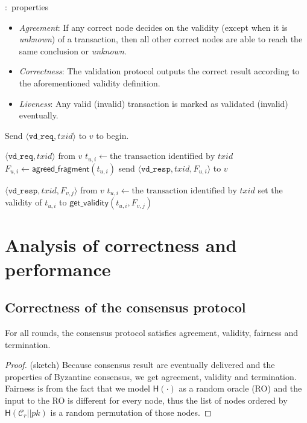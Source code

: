\documentclass{beamer}
\newcommand{\C}{\mathcal{C}}
\begin{document}
\begin{frame}{\subsecname:~properties}
\begin{itemize}
    \item \emph{Agreement}:
        If any correct node decides on the validity (except when it is \emph{unknown}) of a transaction,
        then all other correct nodes are able to reach the same conclusion or \emph{unknown}.
    \item \emph{Correctness}:
        The validation protocol outputs the correct result
        according to the aforementioned validity definition.
    \item \emph{Liveness}:
        Any valid (invalid) transaction is marked as validated (invalid) eventually.
\end{itemize}
\end{frame}

\begin{frame}{\subsecname}
Send $\langle \texttt{vd\_req}, txid \rangle$ to $v$ to begin.
\vspace{5 mm}
\begin{algorithmic}
    \Upon $\langle \texttt{vd\_req}, txid \rangle$ from $v$
        \State $t_{u, i} \gets \text{the transaction identified by } txid$
        \State $F_{u, i} \gets \textsf{agreed\_fragment}(t_{u, i})$
        \State send $\langle \texttt{vd\_resp}, txid, F_{u, i} \rangle$ to $v$

    \Upon $\langle \texttt{vd\_resp}, txid, F_{v, j} \rangle$ from $v$
        \State $t_{u, i} \gets \text{the transaction identified by } txid$
        \State set the validity of $t_{u, i}$ to $\textsf{get\_validity}(t_{u, i}, F_{v, j})$
\end{algorithmic}
\end{frame}

\section{Analysis of correctness and performance}

\subsection{Correctness of the consensus protocol}
\begin{frame}{\subsecname}
\begin{theorem}
For all rounds,
the consensus protocol satisfies agreement, validity, fairness and termination.
\end{theorem}
\begin{proof}(sketch)
Because consensus result are eventually delivered and the properties of Byzantine consensus,
we get agreement, validity and termination.
Fairness is from the fact that we model $\textsf{H}(\cdot)$ as a random oracle (RO) and the input to the RO is different for every node,
thus the list of nodes ordered by $\textsf{H}(\C_r || pk )$ is a random permutation of those nodes.
\end{proof}
\end{frame}
\end{document}
